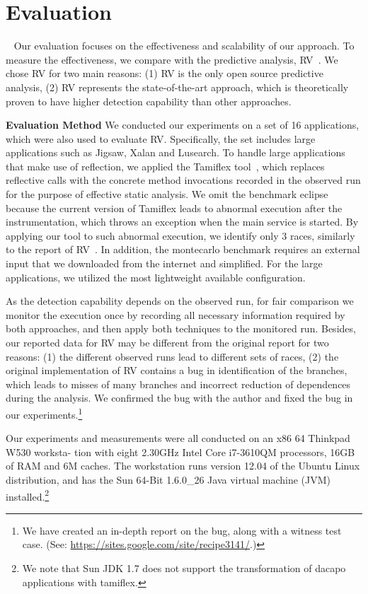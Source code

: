 \section{Evaluation}~\label{sec:eval}
Our evaluation focuses on the effectiveness  and scalability of our approach.
To measure the effectiveness, we compare with the predictive analysis, {\sf RV}~\cite{}. We chose RV for two main reasons: (1) {\sf RV} is the only open source predictive analysis, (2) {\sf RV} represents the state-of-the-art approach, which is theoretically proven to have higher detection capability than other approaches. 

{\bf Evaluation Method} We conducted our experiments on a set of 16 applications, which were also used to evaluate {\sf RV}. Specifically, the set includes large applications such as {\sf Jigsaw}, {\sf Xalan} and {\sf Lusearch}. To handle large applications that make use of reflection, we applied the {\sf Tamiflex} tool~\cite{}, which replaces reflective calls with the concrete method invocations recorded in the observed run for the purpose of effective static analysis.  We omit the benchmark {\sf eclipse} because the current version of {\sf Tamiflex}  leads to abnormal execution after the instrumentation, which throws an exception when the main service is started. By applying our tool to such abnormal execution, we identify only 3 races, similarly to the report of RV~\cite{}.
In addition, the {\sf montecarlo} benchmark requires an external input that we downloaded from the internet and simplified. For the large applications, we utilized the most lightweight available configuration.


 As the detection capability  depends on the observed run, for fair comparison we monitor the execution once by recording all necessary information required by both approaches, and then apply both techniques to the monitored run. Besides, our reported data for RV may be different from the original report for two reasons: (1) the different observed runs lead to different sets of races, (2) the original implementation of RV contains a bug in identification of the branches, which leads to  misses of many branches and  incorrect reduction of dependences during the analysis. We confirmed the bug with the author and fixed the bug in our experiments.\footnote{We have created an in-depth report on the bug, along with a witness test case. (See:  \url{https://sites.google.com/site/recipe3141/}.)}


Our experiments and measurements 
were all conducted on an x86 64 Thinkpad W530 worksta- 
tion with eight 2.30GHz Intel Core i7-3610QM processors, 
16GB of RAM and 6M caches. The workstation runs version 12.04 of the Ubuntu Linux distribution, and has the Sun 
64-Bit 1.6.0\_26 Java virtual machine (JVM) installed.\footnote{We note that Sun JDK 1.7 does not support the transformation of dacapo applications with {\sf tamiflex}.}


